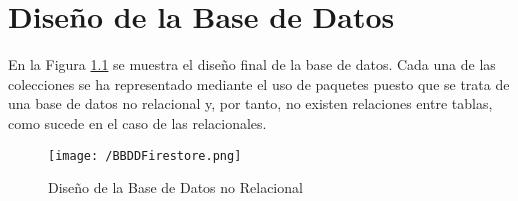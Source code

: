 \chapter{Diseño de la Base de Datos}
\label{chap:bbdd}
En la Figura \ref{fig:bbddfirestore} se muestra el diseño final de la base de datos. Cada una de las colecciones se ha representado mediante el uso de paquetes puesto que se trata de una base de datos no relacional y, por tanto, no existen relaciones entre tablas, como sucede en el caso de las relacionales.

\begin{figure}[!h]
	\begin{center}
		\texttt{[image: /BBDDFirestore.png]}
		\caption{Diseño de la Base de Datos no Relacional}
		\label{fig:bbddfirestore}
	\end{center}
\end{figure}
